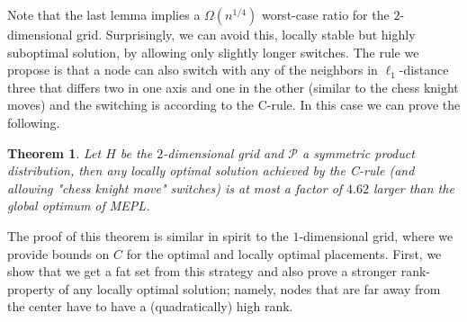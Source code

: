 \documentclass[conference]{IEEEtran}
\def\Pc{\mathcal{P}}
\newtheorem{theorem}{Theorem}
\begin{document}
Note that the last lemma implies a $\Omega(n^{1/4})$ worst-case ratio for the $2$-dimensional grid. Surprisingly, we can avoid this, locally stable but highly suboptimal solution, by allowing only slightly longer switches. The rule we propose is that a node can also switch with any of the neighbors in $\ell_1$-distance three that differs two in one axis and one in the other (similar to the chess knight moves) and the switching is according to the C-rule. In this case we can prove the following.

\begin{theorem}\label{thm:approx-grid}
Let $H$ be the $2$-dimensional grid and $\Pc$ a symmetric product distribution, then any locally optimal solution achieved by the C-rule (and allowing "chess knight move" switches) is at most a factor of $4.62$ larger than the global optimum of MEPL.
\end{theorem}

The proof of this theorem is similar in spirit to the $1$-dimensional grid, where we provide bounds on $C$ for the optimal and locally optimal placements.
First, we show that we get a fat set from this strategy and also prove a stronger rank-property of any locally optimal solution; namely, nodes that are far away from the center have to have a (quadratically) high rank. 
\end{document}
